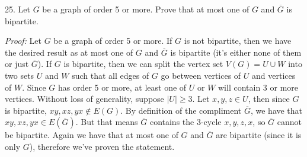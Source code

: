 \documentclass[12pt]{article}
\begin{document}
\pagebreak

25. Let $G$ be a graph of order 5 or more. Prove that at most one of $G$ and $\overline{G}$ is bipartite.

\vspace{7pt}

\emph{Proof:}
    Let $G$ be a graph of order 5 or more. If $G$ is not bipartite, then we have the desired result as at most one of $G$ and $\overline{G}$ is bipartite (it's either none of them or just $\overline{G}$). If  $G$ is bipartite, then we can split the vertex set $V(G)= U \cup W$ into two sets $U$ and $W$ such that all edges of $G$ go between vertices of $U$ and vertices of $W$. Since $G$ has order 5 or more, at least one of $U$ or $W$ will contain 3 or more vertices. Without loss of generality, suppose $|U| \geq 3$. Let $x,y,z \in U$, then since $G$ is bipartite, $xy,xz,yx \not\in E(G)$. By definition of the compliment $\overline{G}$, we have that $xy,xz,yx \in E(\overline{G})$. But that means $\overline{G}$ contains the 3-cycle $x,y,z,x$, so $\overline{G}$ cannot be bipartite. Again we have that at most one of $G$ and $\overline{G}$ are bipartite (since it is only $G$), therefore we've proven the statement.
    
\end{document}

